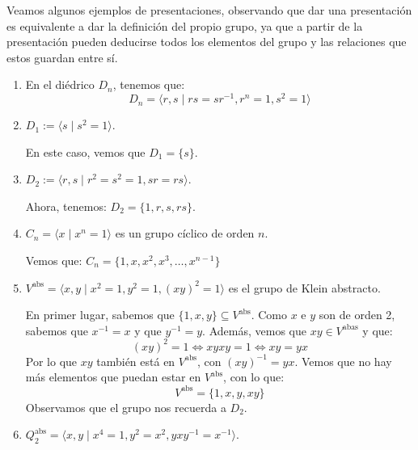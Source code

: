 \begin{ejemplo}
    Veamos algunos ejemplos de presentaciones, observando que dar una presentación es equivalente a dar la definición del propio grupo, ya que a partir de la presentación pueden deducirse todos los elementos del grupo y las relaciones que estos guardan entre sí.
    \begin{enumerate}
        \item En el diédrico $D_n$, tenemos que:
        \begin{equation*}
            D_n = \langle r,s \mid rs=sr^{-1}, r^n = 1, s^2 = 1 \rangle 
        \end{equation*}
        \item $D_1 := \langle s\mid s^2 = 1 \rangle$.

            En este caso, vemos que $D_1 = \{s\}$.
        \item $D_2 := \langle r,s\mid r^2 = s^2 = 1, sr=rs \rangle$.

            Ahora, tenemos: $D_2 = \{1, r, s, rs\}$.
        \item $C_n = \langle x \mid x^n = 1 \rangle $ es un grupo cíclico de orden $n$.
            
            Vemos que: $C_n = \{1, x, x^2, x^3, \ldots, x^{n-1}\}$
        \item $V^{\text{abs}} = \langle x,y \mid x^2=1,y^2 = 1, {(xy)}^{2}=1 \rangle $ es el grupo de Klein abstracto.

            En primer lugar, sabemos que $\{1,x,y\}\subseteq V^{\text{abs}}$. Como $x$ e $y$ son de orden 2, sabemos que $x^{-1} = x$ y que $y^{-1} = y$. Además, vemos que $xy\in V^{\text{abas}}$ y que:
            \begin{equation*}
                {(xy)}^{2} = 1 \Longleftrightarrow xyxy = 1 \Longleftrightarrow xy = yx
            \end{equation*}
            Por lo que $xy$ también está en $V^{\text{abs}}$, con ${(xy)}^{-1} = yx$. Vemos que no hay más elementos que puedan estar en $V^{\text{abs}}$, con lo que:
            \begin{equation*}
                V^{\text{abs}} = \{1,x,y,xy\}
            \end{equation*}
            Observamos que el grupo nos recuerda a $D_2$.
        \item $Q_2^{\text{abs}} = \langle x,y\mid x^4 = 1, y^2 = x^2, yxy^{-1} = x^{-1} \rangle $.


\end{enumerate}
\end{ejemplo}
